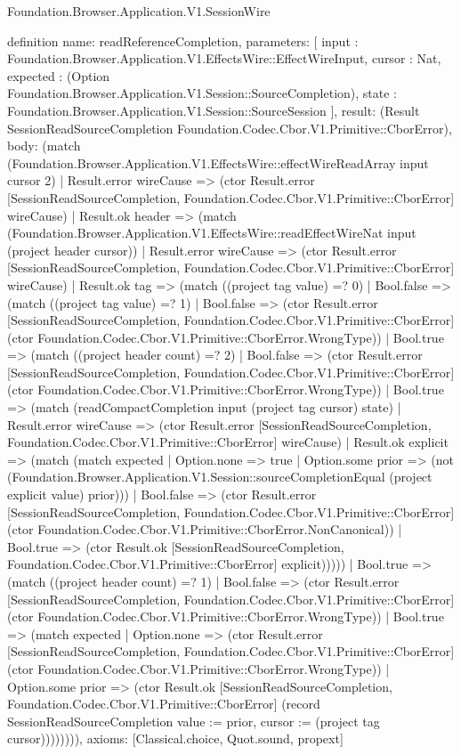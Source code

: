 \begin{lexlean}{Foundation.Browser.Application.V1.SessionWire}
\begin{semanticmodule}
definition{
  name: readReferenceCompletion,
  parameters: [
    input : Foundation.Browser.Application.V1.EffectsWire::EffectWireInput,
    cursor : Nat,
    expected : (Option Foundation.Browser.Application.V1.Session::SourceCompletion),
    state : Foundation.Browser.Application.V1.Session::SourceSession
  ],
  result: (Result SessionReadSourceCompletion Foundation.Codec.Cbor.V1.Primitive::CborError),
  body: (match (Foundation.Browser.Application.V1.EffectsWire::effectWireReadArray input cursor 2)
    | Result.error wireCause => (ctor Result.error [SessionReadSourceCompletion, Foundation.Codec.Cbor.V1.Primitive::CborError] wireCause)
    | Result.ok header => (match (Foundation.Browser.Application.V1.EffectsWire::readEffectWireNat input (project header cursor))
      | Result.error wireCause => (ctor Result.error [SessionReadSourceCompletion, Foundation.Codec.Cbor.V1.Primitive::CborError] wireCause)
      | Result.ok tag => (match ((project tag value) =? 0)
        | Bool.false => (match ((project tag value) =? 1)
          | Bool.false => (ctor Result.error [SessionReadSourceCompletion, Foundation.Codec.Cbor.V1.Primitive::CborError] (ctor Foundation.Codec.Cbor.V1.Primitive::CborError.WrongType))
          | Bool.true => (match ((project header count) =? 2)
            | Bool.false => (ctor Result.error [SessionReadSourceCompletion, Foundation.Codec.Cbor.V1.Primitive::CborError] (ctor Foundation.Codec.Cbor.V1.Primitive::CborError.WrongType))
            | Bool.true => (match (readCompactCompletion input (project tag cursor) state)
              | Result.error wireCause => (ctor Result.error [SessionReadSourceCompletion, Foundation.Codec.Cbor.V1.Primitive::CborError] wireCause)
              | Result.ok explicit => (match (match expected
                  | Option.none => true
                  | Option.some prior => (not (Foundation.Browser.Application.V1.Session::sourceCompletionEqual (project explicit value) prior)))
                | Bool.false => (ctor Result.error [SessionReadSourceCompletion, Foundation.Codec.Cbor.V1.Primitive::CborError] (ctor Foundation.Codec.Cbor.V1.Primitive::CborError.NonCanonical))
                | Bool.true => (ctor Result.ok [SessionReadSourceCompletion, Foundation.Codec.Cbor.V1.Primitive::CborError] explicit)))))
        | Bool.true => (match ((project header count) =? 1)
          | Bool.false => (ctor Result.error [SessionReadSourceCompletion, Foundation.Codec.Cbor.V1.Primitive::CborError] (ctor Foundation.Codec.Cbor.V1.Primitive::CborError.WrongType))
          | Bool.true => (match expected
            | Option.none => (ctor Result.error [SessionReadSourceCompletion, Foundation.Codec.Cbor.V1.Primitive::CborError] (ctor Foundation.Codec.Cbor.V1.Primitive::CborError.WrongType))
            | Option.some prior => (ctor Result.ok [SessionReadSourceCompletion, Foundation.Codec.Cbor.V1.Primitive::CborError] (record SessionReadSourceCompletion {value := prior, cursor := (project tag cursor)}))))))),
  axioms: [Classical.choice, Quot.sound, propext]
}


\end{semanticmodule}
\end{lexlean}
